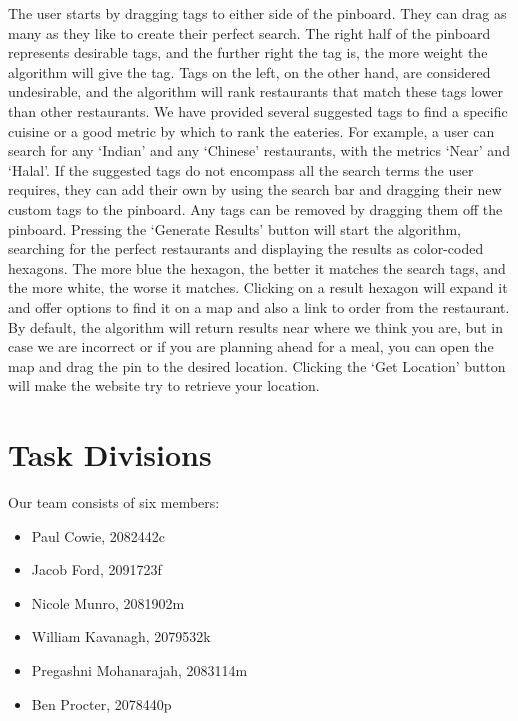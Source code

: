 \documentclass[10pt,a4paper]{article}
\begin{document}
The user starts by dragging tags to either side of the pinboard. They can drag as many as they like to create their perfect search. The right half of the pinboard represents desirable tags, and the further right the tag is, the more weight the algorithm will give the tag. Tags on the left, on the other hand, are considered undesirable, and the algorithm will rank restaurants that match these tags lower than other restaurants. We have provided several suggested tags to find a specific cuisine or a good metric by which to rank the eateries. For example, a user can search for any ‘Indian’ and any ‘Chinese’ restaurants, with the metrics ‘Near’ and ‘Halal’. If the suggested tags do not encompass all the search terms the user requires, they can add their own by using the search bar and dragging their new custom tags to the pinboard. Any tags can be removed by dragging them off the pinboard. Pressing the ‘Generate Results’ button will start the algorithm, searching for the perfect restaurants and displaying the results as color-coded hexagons. The more blue the hexagon, the better it matches the search tags, and the more white, the worse it matches. Clicking on a result hexagon will expand it and offer options to find it on a map and also a link to order from the restaurant. By default, the algorithm will return results near where we think you are, but in case we are incorrect or if you are planning ahead for a meal, you can open the map and drag the pin to the desired location. Clicking the ‘Get Location’ button will make the website try to retrieve your location. 

\section*{Task Divisions}

Our team consists of six members:
\begin{itemize}
	\item Paul Cowie, 2082442c
	\item Jacob Ford, 2091723f
	\item Nicole Munro, 2081902m
	\item William Kavanagh, 2079532k
	\item Pregashni Mohanarajah, 2083114m
	\item Ben Procter, 2078440p
\end{itemize}
\end{document}
